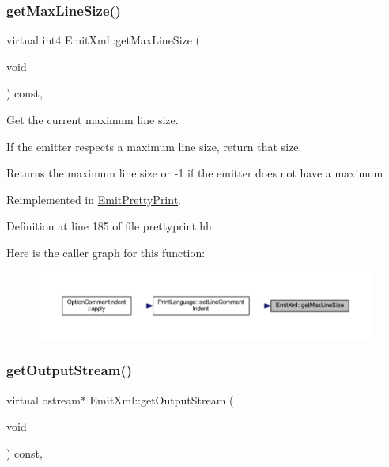 \subsubsection{\texorpdfstring{getMaxLineSize()}{getMaxLineSize()}}
{\footnotesize\ttfamily virtual int4 Emit\+Xml\+::get\+Max\+Line\+Size (\begin{DoxyParamCaption}\item[{void}]{ }\end{DoxyParamCaption}) const\hspace{0.3cm}{\ttfamily [inline]}, {\ttfamily [virtual]}}



Get the current maximum line size. 

If the emitter respects a maximum line size, return that size. \begin{DoxyReturn}{Returns}
the maximum line size or -\/1 if the emitter does not have a maximum 
\end{DoxyReturn}


Reimplemented in \mbox{\hyperlink{class_emit_pretty_print_a32cde009472958f2b1350ed8461c979e}{Emit\+Pretty\+Print}}.



Definition at line 185 of file prettyprint.\+hh.

Here is the caller graph for this function\+:
\nopagebreak
\begin{figure}[H]
\begin{center}
\leavevmode
\includegraphics[width=350pt]{class_emit_xml_a3867bff6084118990799e3d9a2c1eb00_icgraph}
\end{center}
\end{figure}
\mbox{\label{class_emit_xml_a1190216f59dd61157699a2ee4f2f4b29}} 
\subsubsection{\texorpdfstring{getOutputStream()}{getOutputStream()}}
{\footnotesize\ttfamily virtual ostream$\ast$ Emit\+Xml\+::get\+Output\+Stream (\begin{DoxyParamCaption}\item[{void}]{ }\end{DoxyParamCaption}) const\hspace{0.3cm}{\ttfamily [inline]}, {\ttfamily [virtual]}}



